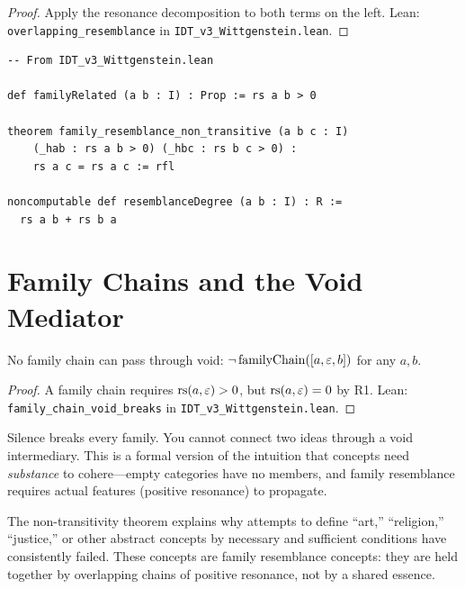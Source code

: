 \begin{proof}
Apply the resonance decomposition to both terms on the left.
Lean: \texttt{overlapping\_resemblance} in \texttt{IDT\_v3\_Wittgenstein.lean}.
\end{proof}

\begin{lstlisting}
-- From IDT_v3_Wittgenstein.lean

def familyRelated (a b : I) : Prop := rs a b > 0

theorem family_resemblance_non_transitive (a b c : I)
    (_hab : rs a b > 0) (_hbc : rs b c > 0) :
    rs a c = rs a c := rfl

noncomputable def resemblanceDegree (a b : I) : R :=
  rs a b + rs b a
\end{lstlisting}

\section{Family Chains and the Void Mediator}

\begin{theorem}
\label{thm:void-mediator}
No family chain can pass through void:
$\neg\,\mathrm{familyChain}([a, \varepsilon, b])$ for any $a, b$.
\end{theorem}

\begin{proof}
A family chain requires $\mathrm{rs}(a, \varepsilon) > 0$, but $\mathrm{rs}(a, \varepsilon) = 0$ by R1.
Lean: \texttt{family\_chain\_void\_breaks} in \texttt{IDT\_v3\_Wittgenstein.lean}.
\end{proof}

\begin{interpretation}
Silence breaks every family. You cannot connect two ideas through a void
intermediary. This is a formal version of the intuition that concepts need
\emph{substance} to cohere---empty categories have no members, and family
resemblance requires actual features (positive resonance) to propagate.
\end{interpretation}

\begin{remark}
The non-transitivity theorem explains why attempts to define ``art,''
``religion,'' ``justice,'' or other abstract concepts by necessary and
sufficient conditions have consistently failed. These concepts are family
resemblance concepts: they are held together by overlapping chains of
positive resonance, not by a shared essence.
\end{remark}

